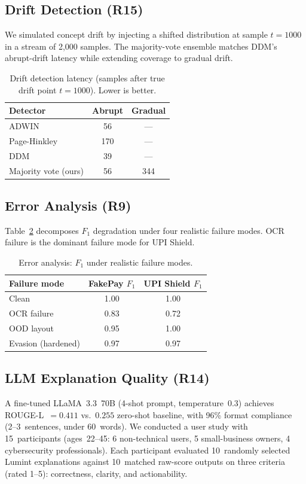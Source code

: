 \documentclass[conference]{IEEEtran}
\begin{document}
\subsection{Drift Detection (R15)}
\vspace{2mm}
We simulated concept drift by injecting a shifted distribution at
sample $t{=}1000$ in a stream of 2{,}000 samples. The majority-vote
ensemble matches DDM's abrupt-drift latency while extending coverage
to gradual drift.

\begin{table}[t]
\centering
\caption{Drift detection latency (samples after true drift point
$t{=}1000$). Lower is better.}
\label{tab:drift}
\begin{tabular}{lcc}
\toprule
\textbf{Detector} & \textbf{Abrupt} & \textbf{Gradual} \\
\midrule
ADWIN                & 56  & --- \\
Page-Hinkley         & 170 & --- \\
DDM                  & 39  & --- \\
Majority vote (ours) & 56  & 344 \\
\bottomrule
\end{tabular}
\end{table}

\subsection{Error Analysis (R9)}
\vspace{2mm}
Table~\ref{tab:error} decomposes $F_1$ degradation under four realistic
failure modes. OCR failure is the dominant failure mode for UPI
Shield.

\begin{table}[t]
\centering
\caption{Error analysis: $F_1$ under realistic failure modes.}
\label{tab:error}
\begin{tabular}{lcc}
\toprule
\textbf{Failure mode} & \textbf{FakePay $F_1$} & \textbf{UPI Shield $F_1$} \\
\midrule
Clean                & 1.00 & 1.00 \\
OCR failure          & 0.83 & 0.72 \\
OOD layout           & 0.95 & 1.00 \\
Evasion (hardened)   & 0.97 & 0.97 \\
\bottomrule
\end{tabular}
\end{table}

\subsection{LLM Explanation Quality (R14)}
\vspace{2mm}
A fine-tuned LLaMA~3.3~70B (4-shot prompt, temperature~0.3) achieves
ROUGE-L~$=0.411$ vs.\ $0.255$ zero-shot baseline, with 96\% format
compliance (2--3~sentences, under 60~words). We conducted a user study
with 15~participants (ages~22--45: 6 non-technical users, 5
small-business owners, 4 cybersecurity professionals). Each
participant evaluated 10~randomly selected Lumint explanations against
10~matched raw-score outputs on three criteria (rated 1--5):
correctness, clarity, and actionability.
\end{document}
